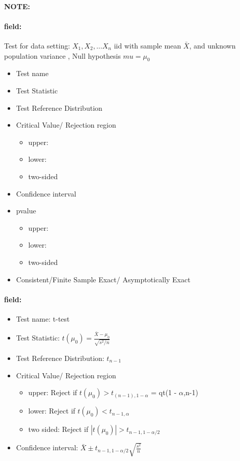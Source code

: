\documentclass[12pt]{article}
\newenvironment{note}{\paragraph{NOTE:}}{}
\newenvironment{field}{\paragraph{field:}}{}
\begin{document}
\begin{note}
	\begin{field}
		Test for data setting: $X_1, X_2, \ldots X_n$ iid with sample mean $\bar{X}$, and unknown population variance , Null hypothesis $mu = \mu_0$
		\begin{itemize}
			\item Test name
			\item Test Statistic
			\item Test Reference Distribution
			\item Critical Value/ Rejection region
			      \begin{itemize}
				      \item upper:
				      \item lower:
				      \item two-sided
			      \end{itemize}
			\item Confidence interval
			\item pvalue
			      \begin{itemize}
				      \item upper:
				      \item lower:
				      \item two-sided
			      \end{itemize}
			\item Consistent/Finite Sample Exact/ Asymptotically Exact
		\end{itemize}
	\end{field}
	\begin{field}
		\begin{itemize}
			\item Test name: t-test
			\item Test Statistic: $t(\mu_0) = \frac{\bar{X} - \mu_0}{\sqrt{s^2/n}}$
			\item Test Reference Distribution: $t_{n-1}$
			\item Critical Value/ Rejection region
			      \begin{itemize}
				      \item upper: Reject if $t(\mu_0) > t_{(n-1),1-\alpha}$ = qt(1 - $\alpha$,n-1)
				      \item lower: Reject if $t(\mu_0)  < t_{n-1,\alpha}$
              \item two sided: Reject if $|t(\mu_0)| > t_{n-1, 1 - \alpha/2}$
			      \end{itemize}
			\item Confidence interval: $\bar{X} \pm t_{n-1,1-\alpha/2}\sqrt{\frac{s^2}{n}}$

\end{itemize}
\end{field}
\end{note}
\end{document}
